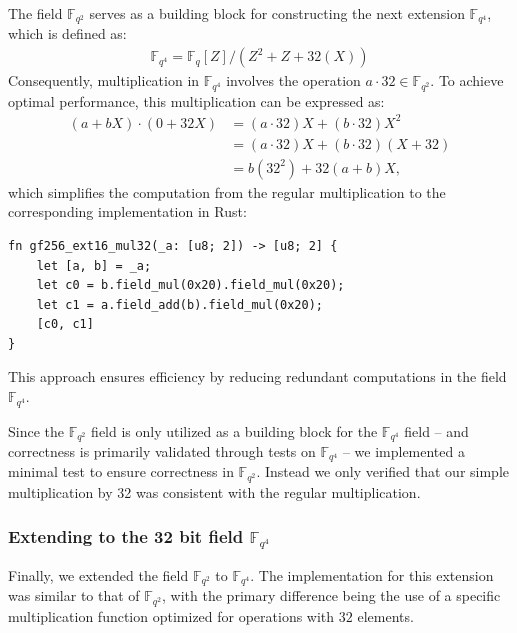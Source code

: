 \documentclass[11pt]{report}
\theoremstyle{definition}
\theoremstyle{plain}
\begin{document}
The field $\mathbb{F}_{q^2}$ serves as a building block for constructing the next extension $\mathbb{F}_{q^4}$, which is defined as:
\begin{align}
  \mathbb{F}_{q^4} = \mathbb{F}_q[Z] / (Z^2 + Z + 32(X))\label{eq:fq4}
\end{align}
Consequently, multiplication in $\mathbb{F}_{q^4}$ involves the operation $a \cdot 32 \in \mathbb{F}_{q^2}$.
To achieve optimal performance, this multiplication can be expressed as:
\begin{align*}
  (a + bX) \cdot (0 + 32X) & = (a \cdot 32)X + (b \cdot 32)X^2      \\
                           & = (a \cdot 32)X + (b \cdot 32)(X + 32) \\
                           & = b(32^2) + 32(a + b)X,
\end{align*}
which simplifies the computation from the regular multiplication to the corresponding implementation in Rust:
\begin{verbatim}
fn gf256_ext16_mul32(_a: [u8; 2]) -> [u8; 2] {
    let [a, b] = _a;
    let c0 = b.field_mul(0x20).field_mul(0x20);
    let c1 = a.field_add(b).field_mul(0x20);
    [c0, c1]
}
\end{verbatim}

This approach ensures efficiency by reducing redundant computations in the field $\mathbb{F}_{q^4}$.

Since the $\mathbb{F}_{q^2}$ field is only utilized as a building block for the $\mathbb{F}_{q^4}$ field -- and correctness is primarily validated through tests on $\mathbb{F}_{q^4}$ -- we implemented a minimal test to ensure correctness in $\mathbb{F}_{q^2}$. Instead we only verified that our simple multiplication by 32 was consistent with the regular multiplication.




\subsubsection{Extending to the 32 bit field $\mathbb{F}_{q^4}$}\label{sec:gf_256_32_bit_field}
Finally, we extended the field $\mathbb{F}_{q^2}$ to $\mathbb{F}_{q^4}$. The implementation for this extension was similar to that of $\mathbb{F}_{q^2}$, with the primary difference being the use of a specific multiplication function optimized for operations with $32$ elements.
\end{document}
